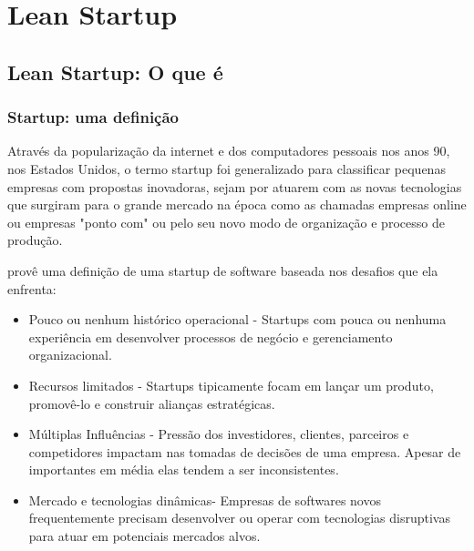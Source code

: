 \chapter{Lean Startup}
\label{cap:leanstartup}
\section{Lean Startup: O que é}
\subsection{Startup: uma definição}
\par Através da popularização da internet e dos computadores pessoais nos anos 90, nos Estados Unidos, o termo startup foi generalizado para classificar pequenas empresas com propostas inovadoras, sejam por atuarem com as novas tecnologias que surgiram para o grande mercado na época como as chamadas empresas online ou empresas "ponto com" ou  pelo seu novo modo de organização e processo de produção.
\par \cite{nicolo:14} provê uma definição de uma startup de software baseada nos desafios que ela enfrenta:
\begin{itemize}
\item Pouco ou nenhum histórico operacional - Startups com pouca ou nenhuma experiência em desenvolver processos de negócio e gerenciamento organizacional.
\item Recursos limitados - Startups tipicamente focam em lançar um produto, promovê-lo e construir alianças estratégicas.
\item Múltiplas Influências - Pressão dos investidores, clientes, parceiros e competidores impactam nas tomadas de decisões de uma empresa. Apesar de importantes em média elas tendem a ser inconsistentes.
\item Mercado e tecnologias dinâmicas- Empresas de softwares novos frequentemente precisam desenvolver ou operar com tecnologias disruptivas para atuar em potenciais mercados alvos.
\end{itemize}

